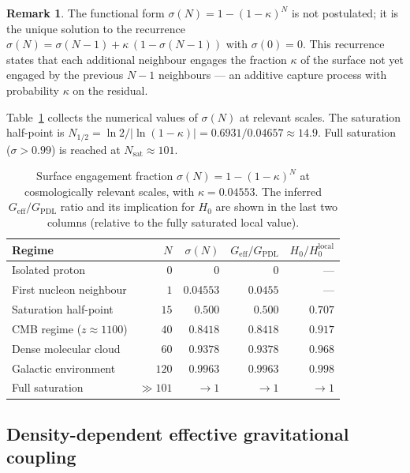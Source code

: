 \documentclass[11pt,a4paper]{article}
\theoremstyle{definition}
\newtheorem{remark}[theorem]{Remark}
\newcommand{\Geff}{G_{\mathrm{eff}}}
\newcommand{\GPDL}{G_{\mathrm{PDL}}}
\newcommand{\Hzero}{H_0}
\newcommand{\kap}{\kappa}
\newcommand{\sig}{\sigma}
\begin{document}
\begin{remark}
The functional form $\sig(N) = 1-(1-\kap)^N$ is not postulated; it is the unique solution to the recurrence $\sig(N) = \sig(N-1) + \kap\,(1-\sig(N-1))$ with $\sig(0) = 0$. This recurrence states that each additional neighbour engages the fraction $\kap$ of the surface not yet engaged by the previous $N-1$ neighbours --- an additive capture process with probability $\kap$ on the residual.
\end{remark}

Table~\ref{tab:sigma} collects the numerical values of $\sig(N)$ at relevant scales. The saturation half-point is $N_{1/2} = \ln 2/|\ln(1-\kap)| = 0.6931/0.04657 \approx 14.9$. Full saturation ($\sig > 0.99$) is reached at $N_{\mathrm{sat}} \approx 101$.

\begin{table}[ht]
\centering
\caption{Surface engagement fraction $\sig(N) = 1-(1-\kap)^N$ at cosmologically relevant scales, with $\kap = 0.04553$. The inferred $G_{\mathrm{eff}}/\GPDL$ ratio and its implication for $\Hzero$ are shown in the last two columns (relative to the fully saturated local value).}
\label{tab:sigma}
\bigskip
\begin{tabular}{lrrrr}
\toprule
Regime & $N$ & $\sig(N)$ & $\Geff/\GPDL$ & $\Hzero/\Hzero^{\mathrm{local}}$ \\
\midrule
Isolated proton & $0$ & $0$ & $0$ & --- \\
First nucleon neighbour & $1$ & $0.04553$ & $0.0455$ & --- \\
Saturation half-point & $15$ & $0.500$ & $0.500$ & $0.707$ \\
CMB regime ($z \approx 1100$) & $40$ & $0.8418$ & $0.8418$ & $0.917$ \\
Dense molecular cloud & $60$ & $0.9378$ & $0.9378$ & $0.968$ \\
Galactic environment & $120$ & $0.9963$ & $0.9963$ & $0.998$ \\
Full saturation & $\gg 101$ & $\to 1$ & $\to 1$ & $\to 1$ \\
\bottomrule
\end{tabular}
\end{table}

\subsection{Density-dependent effective gravitational coupling}
\label{subsec:Geff}
\end{document}
